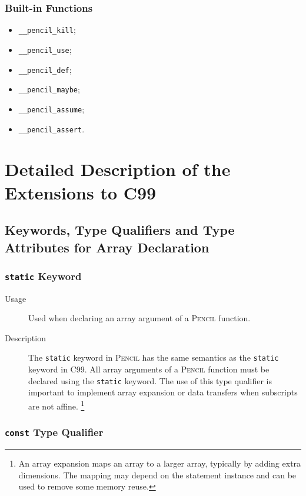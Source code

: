 \documentclass{carp}
\newcommand\pencil{\textsc{Pencil}\xspace}
\begin{document}
\subsection*{Built-in Functions}

\begin{itemize}
\item \lstinline!__pencil_kill!;
\item \lstinline!__pencil_use!;
\item \lstinline!__pencil_def!;
\item \lstinline!__pencil_maybe!;
\item \lstinline!__pencil_assume!;
\item \lstinline!__pencil_assert!.
\end{itemize}

\chapter{Detailed Description of the Extensions to C99}
\label{sec:Annotations-and-directives}

\section{Keywords, Type Qualifiers and Type Attributes for Array Declaration}
\label{sec:array-type-qualifiers-section}

\subsection{\lstinline!static! Keyword}
\label{sec:static}

\begin{description}
\item [Usage] Used when declaring an array argument of a \pencil function.
\item [Description] The \lstinline!static! keyword in \pencil
has the same semantics as the \lstinline!static! keyword in C99.
All array arguments of a \pencil function
must be declared using the \lstinline!static! keyword.
The use of this type qualifier is
important to implement array expansion or data transfers when
subscripts are not affine.%
\footnote{An array expansion maps an array to a larger array, typically
by adding extra dimensions.  The mapping may depend on the statement
instance and can be used to remove some memory reuse.}
\end{description}

\subsection{\lstinline!const! Type Qualifier}
\label{sec:const}
\end{document}

